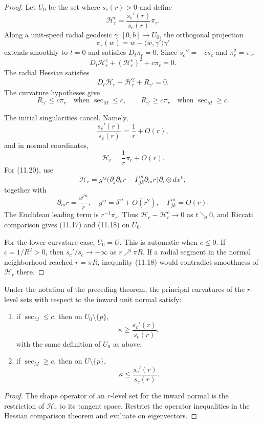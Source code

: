 \begin{proof}
\sketch Let $U_0$ be the set where $s_c(r)>0$ and define
\[
\mathcal H_r^c=\frac{s_c'(r)}{s_c(r)}\pi_r.
\]
Along a unit-speed radial geodesic $\gamma\colon[0,b]\to U_0$, the orthogonal
projection
\[
\pi_r(w)=w-\langle w,\gamma'\rangle\gamma'
\]
extends smoothly to $t=0$ and satisfies $D_t\pi_r=0$. Since
$s_c''=-cs_c$ and $\pi_r^2=\pi_r$,
\[
D_t\mathcal H_r^c+(\mathcal H_r^c)^2+c\pi_r=0.
\]
The radial Hessian satisfies
\[
D_t\mathcal H_r+\mathcal H_r^2+R_{\gamma'}=0.
\]
The curvature hypotheses give
\[
R_{\gamma'}\leq c\pi_r\quad\text{when }\sec_M\leq c,
\qquad
R_{\gamma'}\geq c\pi_r\quad\text{when }\sec_M\geq c.
\]

The initial singularities cancel. Namely,
\begin{equation}
\frac{s_c'(r)}{s_c(r)}=\frac1r+O(r), \tag{11.19}
\end{equation}
and in normal coordinates,
\begin{equation}
\mathcal H_r=\frac1r\pi_r+O(r). \tag{11.20}
\end{equation}
For (11.20), use
\[
\mathcal H_r
=g^{ij}\bigl(\partial_j\partial_kr
-\Gamma_{jk}^m\partial_mr\bigr)\partial_i\otimes dx^k,
\]
together with
\[
\partial_mr=\frac{x^m}{r},
\quad g^{ij}=\delta^{ij}+O(r^2),
\quad \Gamma_{jk}^m=O(r).
\]
The Euclidean leading term is $r^{-1}\pi_r$. Thus
$\mathcal H_r-\mathcal H_r^c\to0$ as $t\searrow0$, and Riccati comparison gives
(11.17) and (11.18) on $U_0$.

For the lower-curvature case, $U_0=U$. This is automatic when $c\leq0$. If
$c=1/R^2>0$, then $s_c'/s_c\to-\infty$ as $r\nearrow\pi R$. If a radial
segment in the normal neighborhood reached $r=\pi R$, inequality (11.18)
would contradict smoothness of $\mathcal H_r$ there.
\end{proof}

\begin{corollary}
\label{cor:principal-curvature-comparison}

Under the notation of the preceding theorem, the principal curvatures of the
$r$-level sets with respect to the inward unit normal satisfy:
\begin{enumerate}
\item[(a)] if $\sec_M\leq c$, then on $U_0\setminus\{p\}$,
\[
\kappa\geq\frac{s_c'(r)}{s_c(r)},
\]
with the same definition of $U_0$ as above;
\item[(b)] if $\sec_M\geq c$, then on $U\setminus\{p\}$,
\[
\kappa\leq\frac{s_c'(r)}{s_c(r)}.
\]
\end{enumerate}

\begin{proof}
\sketch The shape operator of an $r$-level set for the inward normal is the
restriction of $\mathcal H_r$ to its tangent space. Restrict the operator
inequalities in the Hessian comparison theorem and evaluate on eigenvectors.
\end{proof}
\end{corollary}

